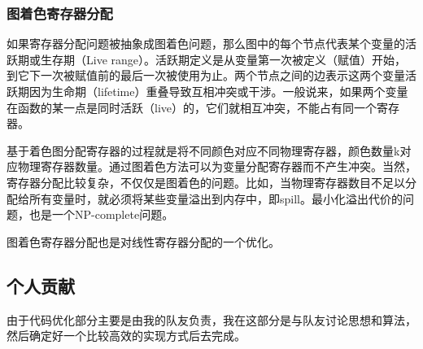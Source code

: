 \documentclass[UTF8,a4paper,10pt]{ctexart}
\begin{document}
\subsubsection{图着色寄存器分配}
如果寄存器分配问题被抽象成图着色问题，那么图中的每个节点代表某个变量的活跃期或生存期（Live range）。活跃期定义是从变量第一次被定义（赋值）开始，到它下一次被赋值前的最后一次被使用为止。两个节点之间的边表示这两个变量活跃期因为生命期（lifetime）重叠导致互相冲突或干涉。一般说来，如果两个变量在函数的某一点是同时活跃（live）的，它们就相互冲突，不能占有同一个寄存器。

基于着色图分配寄存器的过程就是将不同颜色对应不同物理寄存器，颜色数量k对应物理寄存器数量。通过图着色方法可以为变量分配寄存器而不产生冲突。当然，寄存器分配比较复杂，不仅仅是图着色的问题。比如，当物理寄存器数目不足以分配给所有变量时，就必须将某些变量溢出到内存中，即spill。最小化溢出代价的问题，也是一个NP-complete问题。

图着色寄存器分配也是对线性寄存器分配的一个优化。
\subsection{个人贡献}
由于代码优化部分主要是由我的队友负责，我在这部分是与队友讨论思想和算法，然后确定好一个比较高效的实现方式后去完成。















\end{document}
